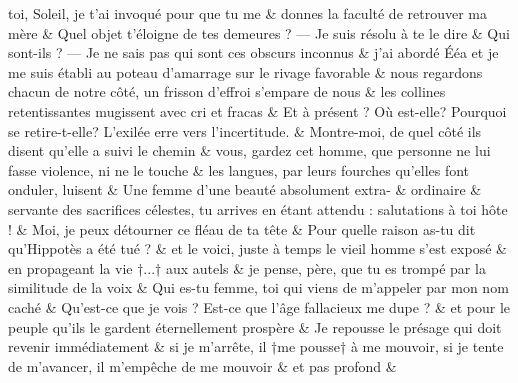 \documentclass[12pt,onecolumn,twoside,a4paper]{memoir}
\begin{document}
\begin{pairs}
\begin{Rightside}
                         \stanza  toi, Soleil, je t’ai invoqué pour que tu me  & 
                     donnes la faculté de retrouver ma mère \&
                         \stanza 
                      Quel objet t’éloigne de tes demeures ? — Je suis résolu à te le
                              dire \&
                         \stanza 
                      Qui sont-ils ? — Je ne sais pas qui sont ces obscurs inconnus \&
                         \stanza 
                      j’ai abordé Ééa et je me suis établi au poteau d’amarrage sur le
                              rivage favorable \&
                         \stanza 
                      nous regardons chacun de notre côté, un frisson d’effroi s’empare de
                              nous \&
                         \stanza 
                      les collines retentissantes mugissent avec cri et fracas \&
                         \stanza 
                      Et à présent ? Où est-elle? Pourquoi se retire-t-elle? L’exilée erre
                              vers l’incertitude. \&
                         \stanza 
                      Montre-moi, de quel côté ils disent qu’elle a suivi le chemin  \&
                         \stanza 
                      vous, gardez cet homme, que personne ne lui fasse violence, ni ne le
                              touche  \&
                         \stanza 
                      les langues, par leurs fourches qu’elles font onduler, luisent  \&
                         \stanza  Une femme d’une beauté absolument extra- & 
                     ordinaire \&
                         \stanza 
                      servante des sacrifices célestes, tu arrives en étant attendu :
                              salutations à toi hôte ! \&
                         \stanza 
                      Moi, je peux détourner ce fléau de ta tête  \&
                         \stanza 
                      Pour quelle raison as-tu dit qu’Hippotès a été tué ? \&
                         \stanza 
                      et le voici, juste à temps le vieil homme s’est exposé  \&
                         \stanza 
                      en propageant la vie †...† aux autels  \&
                         \stanza 
                      je pense, père, que tu es trompé par la similitude de la voix  \&
                         \stanza 
                      Qui es-tu femme, toi qui viens de m’appeler par mon nom caché \&
                         \stanza 
                      Qu’est-ce que je vois ? Est-ce que l’âge fallacieux me dupe ? \&
                         \stanza 
                      et pour le peuple qu’ils le gardent éternellement prospère \&
                         \stanza 
                      Je repousse le présage qui doit revenir immédiatement \&
                         \stanza 
                      si je m’arrête, il †me pousse† à me mouvoir, si je tente de
                              m’avancer, il m’empêche de me mouvoir  \&
                         \stanza 
                      et pas profond  \&
                     
                  \endnumbering
		\end{Rightside}
               \end{pairs}
	\Columns
            
\end{document}
